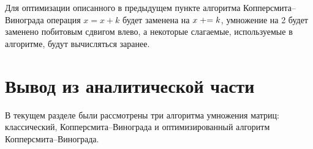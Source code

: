 Для оптимизации описанного в предыдущем пункте алгоритма Копперсмита--Винограда операция $x = x + k$ будет заменена на $x \mathrel{+}= k$, умножение на 2 будет заменено побитовым сдвигом влево, а некоторые слагаемые, используемые в алгоритме, будут вычисляться заранее.

\section*{Вывод из аналитической части}

В текущем разделе были рассмотрены три алгоритма умножения матриц: классический, Копперсмита--Винограда и оптимизированный алгоритм Копперсмита--Винограда.
